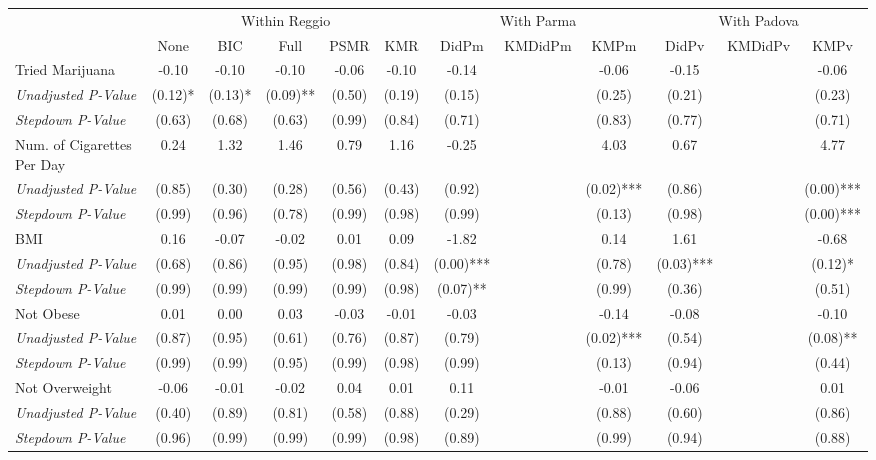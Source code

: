 \begin{tabular}{l c c c c c c c c c c c}
\toprule
& \multicolumn{5}{c}{Within Reggio} & \multicolumn{3}{c}{With Parma} & \multicolumn{3}{c}{With Padova} \\\cmidrule(lr){2-6} \cmidrule(lr){7-9} \cmidrule(lr){10-12}
 & None & BIC & Full & PSMR & KMR & DidPm & KMDidPm & KMPm & DidPv & KMDidPv & KMPv \\
\midrule
Tried Marijuana & -0.10 & -0.10 & -0.10 & -0.06 & -0.10 & -0.14 & & -0.06 & -0.15 & & -0.06 \\
\quad \textit{Unadjusted P-Value} & (0.12)* & (0.13)* & (0.09)** & (0.50) & (0.19) & (0.15) & & (0.25) & (0.21) & & (0.23) \\
\quad \textit{Stepdown P-Value} & (0.63) & (0.68) & (0.63) & (0.99) & (0.84) & (0.71) & & (0.83) & (0.77) & & (0.71) \\
Num. of Cigarettes Per Day & 0.24 & 1.32 & 1.46 & 0.79 & 1.16 & -0.25 & & 4.03 & 0.67 & & 4.77 \\
\quad \textit{Unadjusted P-Value} & (0.85) & (0.30) & (0.28) & (0.56) & (0.43) & (0.92) & & (0.02)*** & (0.86) & & (0.00)*** \\
\quad \textit{Stepdown P-Value} & (0.99) & (0.96) & (0.78) & (0.99) & (0.98) & (0.99) & & (0.13) & (0.98) & & (0.00)*** \\
BMI & 0.16 & -0.07 & -0.02 & 0.01 & 0.09 & -1.82 & & 0.14 & 1.61 & & -0.68 \\
\quad \textit{Unadjusted P-Value} & (0.68) & (0.86) & (0.95) & (0.98) & (0.84) & (0.00)*** & & (0.78) & (0.03)*** & & (0.12)* \\
\quad \textit{Stepdown P-Value} & (0.99) & (0.99) & (0.99) & (0.99) & (0.98) & (0.07)** & & (0.99) & (0.36) & & (0.51) \\
Not Obese & 0.01 & 0.00 & 0.03 & -0.03 & -0.01 & -0.03 & & -0.14 & -0.08 & & -0.10 \\
\quad \textit{Unadjusted P-Value} & (0.87) & (0.95) & (0.61) & (0.76) & (0.87) & (0.79) & & (0.02)*** & (0.54) & & (0.08)** \\
\quad \textit{Stepdown P-Value} & (0.99) & (0.99) & (0.95) & (0.99) & (0.98) & (0.99) & & (0.13) & (0.94) & & (0.44) \\
Not Overweight & -0.06 & -0.01 & -0.02 & 0.04 & 0.01 & 0.11 & & -0.01 & -0.06 & & 0.01 \\
\quad \textit{Unadjusted P-Value} & (0.40) & (0.89) & (0.81) & (0.58) & (0.88) & (0.29) & & (0.88) & (0.60) & & (0.86) \\
\quad \textit{Stepdown P-Value} & (0.96) & (0.99) & (0.99) & (0.99) & (0.98) & (0.89) & & (0.99) & (0.94) & & (0.88) \\

\end{tabular}
